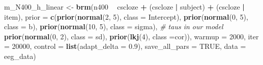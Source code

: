 \documentclass[12pt,ignorenonframetext,aspectratio=169]{beamer}
\newenvironment{Shaded}{\begin{snugshade}}{\end{snugshade}}
\newcommand{\CommentTok}[1]{\textcolor[rgb]{0.56,0.35,0.01}{\textit{#1}}}
\newcommand{\DataTypeTok}[1]{\textcolor[rgb]{0.13,0.29,0.53}{#1}}
\newcommand{\DecValTok}[1]{\textcolor[rgb]{0.00,0.00,0.81}{#1}}
\newcommand{\FloatTok}[1]{\textcolor[rgb]{0.00,0.00,0.81}{#1}}
\newcommand{\KeywordTok}[1]{\textcolor[rgb]{0.13,0.29,0.53}{\textbf{#1}}}
\newcommand{\NormalTok}[1]{#1}
\newcommand{\OperatorTok}[1]{\textcolor[rgb]{0.81,0.36,0.00}{\textbf{#1}}}
\newcommand{\OtherTok}[1]{\textcolor[rgb]{0.56,0.35,0.01}{#1}}
\newcommand{\StringTok}[1]{\textcolor[rgb]{0.31,0.60,0.02}{#1}}
\begin{document}
\begin{frame}[fragile]

\footnotesize

\begin{Shaded}
\begin{Highlighting}[]
\NormalTok{m_N400_h_linear <-}\StringTok{ }\KeywordTok{brm}\NormalTok{(n400 }\OperatorTok{~}\StringTok{ }\NormalTok{cscloze }\OperatorTok{+}
\StringTok{                         }\NormalTok{(cscloze }\OperatorTok{|}\StringTok{ }\NormalTok{subject) }\OperatorTok{+}
\StringTok{                         }\NormalTok{(cscloze }\OperatorTok{|}\StringTok{ }\NormalTok{item),}
                       \DataTypeTok{prior =} \KeywordTok{c}\NormalTok{(}\KeywordTok{prior}\NormalTok{(}\KeywordTok{normal}\NormalTok{(}\DecValTok{2}\NormalTok{, }\DecValTok{5}\NormalTok{), }\DataTypeTok{class =}\NormalTok{ Intercept),}
                                 \KeywordTok{prior}\NormalTok{(}\KeywordTok{normal}\NormalTok{(}\DecValTok{0}\NormalTok{, }\DecValTok{5}\NormalTok{), }\DataTypeTok{class =}\NormalTok{ b),}
                                 \KeywordTok{prior}\NormalTok{(}\KeywordTok{normal}\NormalTok{(}\DecValTok{10}\NormalTok{, }\DecValTok{5}\NormalTok{), }\DataTypeTok{class =}\NormalTok{ sigma),}
                                 \CommentTok{# taus in our model}
                                 \KeywordTok{prior}\NormalTok{(}\KeywordTok{normal}\NormalTok{(}\DecValTok{0}\NormalTok{, }\DecValTok{2}\NormalTok{), }\DataTypeTok{class =}\NormalTok{ sd),}
                                 \KeywordTok{prior}\NormalTok{(}\KeywordTok{lkj}\NormalTok{(}\DecValTok{4}\NormalTok{), }\DataTypeTok{class =}\NormalTok{cor)),}
                       \DataTypeTok{warmup =} \DecValTok{2000}\NormalTok{,}
                       \DataTypeTok{iter =} \DecValTok{20000}\NormalTok{,}
                       \DataTypeTok{control =} \KeywordTok{list}\NormalTok{(}\DataTypeTok{adapt_delta =} \FloatTok{0.9}\NormalTok{),}
                       \DataTypeTok{save_all_pars =} \OtherTok{TRUE}\NormalTok{,}
                       \DataTypeTok{data =}\NormalTok{ eeg_data)}
\end{Highlighting}
\end{Shaded}

\end{frame}
\end{document}
